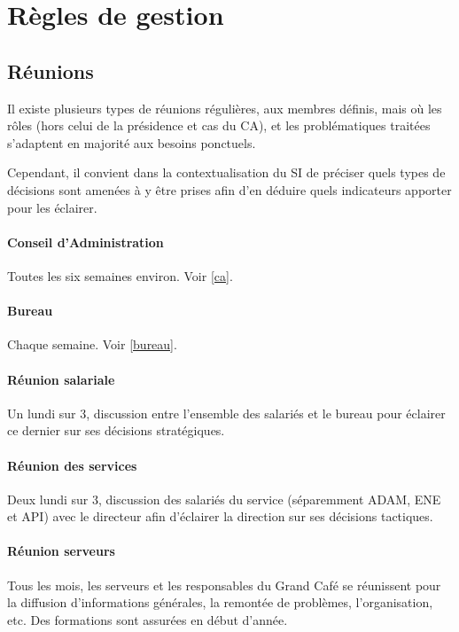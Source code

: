 \section{Règles de gestion}
\label{gestion}

\subsection{Réunions}

Il existe plusieurs types de réunions régulières, aux membres définis,
mais où les rôles (hors celui de la présidence et cas du CA),
et les problématiques traitées s'adaptent en majorité aux besoins ponctuels.

Cependant, il convient dans la contextualisation du SI de préciser quels types
de décisions sont amenées à y être prises afin d'en déduire quels
indicateurs apporter pour les éclairer.

\paragraph{Conseil d'Administration} Toutes les six semaines environ.
Voir \ref{ca}.

\paragraph{Bureau} Chaque semaine. Voir \ref{bureau}.

\paragraph{Réunion salariale} Un lundi sur 3, discussion entre l'ensemble
des salariés et le bureau pour éclairer ce dernier sur ses
décisions stratégiques.

\paragraph{Réunion des services} Deux lundi sur 3, discussion des
salariés du service (séparemment ADAM, ENE et API) avec le directeur
afin d'éclairer la direction sur ses décisions tactiques.

\paragraph{Réunion serveurs} Tous les mois, les serveurs et les responsables
du Grand Café se réunissent pour la diffusion d'informations générales,
la remontée de problèmes, l'organisation, etc. Des formations sont
assurées en début d'année.

